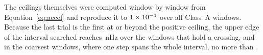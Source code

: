 The ceilings themselves were computed window by window from
Equation~\ref{eq:accel} and reproduce it to $1\times10^{-4}$ over all
\DriftRelNWin{} Class~A windows. Because the last trial is the first at or
beyond the positive ceiling, the upper edge of the interval searched reaches
\EgTopMeasANHz\,nHz over the windows that hold a crossing, and in the
coarsest windows, where one step spans the whole interval, no more than
\EgTopBoundBNHz.

\begin{table}
\caption{The crossings whose fitted drift lies on an outermost trial of
their window's own grid, with the grid each is measured against. Rates are in
the observatory frame, the frame the grid is stepped in;
Table~\ref{tab:pairs} gives them in the star's. A maximum
at the boundary of the interval searched is a lower bound on the rate.}
\label{tab:edge}
\footnotesize

\end{table}

